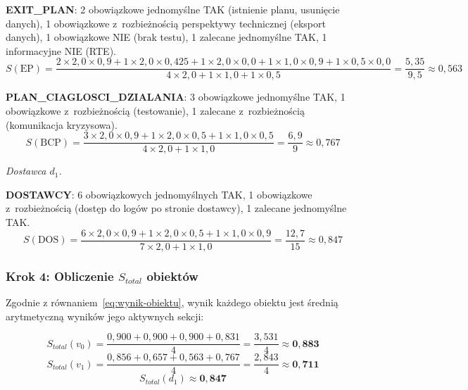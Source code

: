 \textbf{EXIT\_PLAN}: 2 obowiązkowe jednomyślne TAK (istnienie planu, usunięcie danych), 1 obowiązkowe z~rozbieżnością perspektywy technicznej (eksport danych), 1 obowiązkowe NIE (brak testu), 1 zalecane jednomyślne TAK, 1 informacyjne NIE (RTE).
\[
S(\text{EP}) = \frac{2 \times 2{,}0 \times 0{,}9 + 1 \times 2{,}0 \times 0{,}425 + 1 \times 2{,}0 \times 0{,}0 + 1 \times 1{,}0 \times 0{,}9 + 1 \times 0{,}5 \times 0{,}0}{4 \times 2{,}0 + 1 \times 1{,}0 + 1 \times 0{,}5} = \frac{5{,}35}{9{,}5} \approx 0{,}563
\]

\textbf{PLAN\_CIAGLOSCI\_DZIALANIA}: 3 obowiązkowe jednomyślne TAK, 1 obowiązkowe z~rozbieżnością (testowanie), 1 zalecane z~rozbieżnością (komunikacja kryzysowa).
\[
S(\text{BCP}) = \frac{3 \times 2{,}0 \times 0{,}9 + 1 \times 2{,}0 \times 0{,}5 + 1 \times 1{,}0 \times 0{,}5}{4 \times 2{,}0 + 1 \times 1{,}0} = \frac{6{,}9}{9} \approx 0{,}767
\]

\noindent\textit{Dostawca $d_1$.}

\textbf{DOSTAWCY}: 6 obowiązkowych jednomyślnych TAK, 1 obowiązkowe z~rozbieżnością (dostęp do logów po stronie dostawcy), 1 zalecane jednomyślne TAK.
\[
S(\text{DOS}) = \frac{6 \times 2{,}0 \times 0{,}9 + 1 \times 2{,}0 \times 0{,}5 + 1 \times 1{,}0 \times 0{,}9}{7 \times 2{,}0 + 1 \times 1{,}0} = \frac{12{,}7}{15} \approx 0{,}847
\]

\subsubsection*{Krok 4: Obliczenie $S_{total}$ obiektów}

Zgodnie z równaniem~\eqref{eq:wynik-obiektu}, wynik każdego obiektu jest średnią arytmetyczną wyników jego aktywnych sekcji:

\[
S_{total}(v_0) = \frac{0{,}900 + 0{,}900 + 0{,}900 + 0{,}831}{4} = \frac{3{,}531}{4} \approx \mathbf{0{,}883}
\]
\[
S_{total}(v_1) = \frac{0{,}856 + 0{,}657 + 0{,}563 + 0{,}767}{4} = \frac{2{,}843}{4} \approx \mathbf{0{,}711}
\]
\[
S_{total}(d_1) \approx \mathbf{0{,}847}
\]

